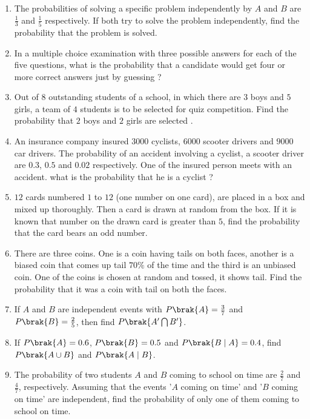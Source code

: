 \begin{enumerate}
\item The probabilities of solving a specific problem independently by $A$ and $B$ are $\frac{1}{3}$ and $\frac{1}{5}$ respectively. If both try to solve the problem independently, find the probability that the problem is solved.
\item In a multiple choice examination with three possible answers for each of the five questions, what is the probability that a candidate would get four or more correct answers just by guessing ?
\item Out of $8$ outstanding students of a school, in which there are $3$ boys and $5$ girls, a team of $4$ students is to be selected for quiz competition. Find the probability that $2$ boys and $2$ girls are selected .
\item An insurance company insured $3000$ cyclists, $6000$ scooter drivers and $9000$ car drivers. The probability of an accident involving a cyclist, a scooter driver are $0.3$, $0.5$ and $0.02$ respectively. One of the insured person meets with an accident. what is the probability that he is a cyclist ?
\item $12$ cards numbered $1$ to $12$ (one number on one card), are placed in a box and mixed up thoroughly. Then a card is drawn at random from the box. If it is known that number on the drawn card is greater than $5$, find the probability that the card bears an odd number.
\item There are three coins. One is a coin having tails on both faces, another is a biased coin that comes up tail $ 70\% $ of the time and the third is an unbiased coin. One of the coins is chosen at random and tossed, it shows tail. Find the probability that it was a coin with tail on both the faces.
     
\item If $A$ and $B$ are independent events with $P\brak{A}=\frac{3}{7}$ and $P\brak{B}=\frac{2}{5}$, then find $P\brak{A'\bigcap B'}$.

\item If $P\brak{A}=0.6$, $P\brak{B}=0.5$ and $P\brak{B\mid A}=0.4$, find $P\brak{A\cup B}$ and $P\brak{A\mid B}$.
    
\item The probability of two students $A$ and $B$ coming to school on time are $\frac{2}{7}$ and $\frac{4}{7}$, respectively. Assuming that the events '$A$ coming on time' and '$B$ coming on time' are independent, find the probability of only one of them coming to school on time.


\end{enumerate}
